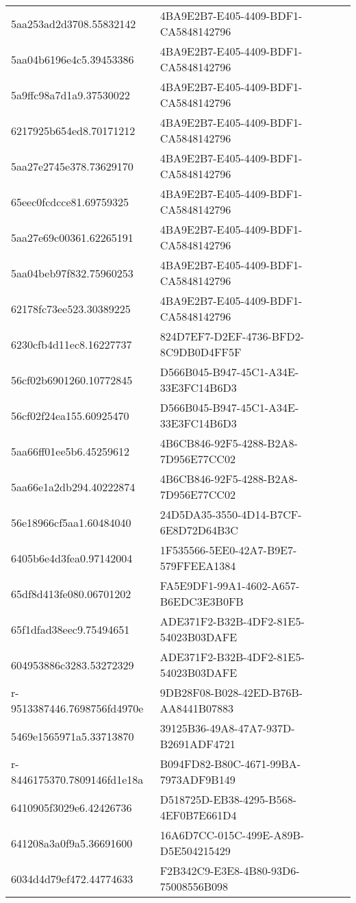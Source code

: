 \begin{tabular}{ll}
5aa253ad2d3708.55832142 & 4BA9E2B7-E405-4409-BDF1-CA5848142796 \\
5aa04b6196e4c5.39453386 & 4BA9E2B7-E405-4409-BDF1-CA5848142796 \\
5a9ffc98a7d1a9.37530022 & 4BA9E2B7-E405-4409-BDF1-CA5848142796 \\
6217925b654ed8.70171212 & 4BA9E2B7-E405-4409-BDF1-CA5848142796 \\
5aa27e2745e378.73629170 & 4BA9E2B7-E405-4409-BDF1-CA5848142796 \\
65eec0fcdcce81.69759325 & 4BA9E2B7-E405-4409-BDF1-CA5848142796 \\
5aa27e69c00361.62265191 & 4BA9E2B7-E405-4409-BDF1-CA5848142796 \\
5aa04beb97f832.75960253 & 4BA9E2B7-E405-4409-BDF1-CA5848142796 \\
62178fc73ee523.30389225 & 4BA9E2B7-E405-4409-BDF1-CA5848142796 \\
6230cfb4d11ec8.16227737 & 824D7EF7-D2EF-4736-BFD2-8C9DB0D4FF5F \\
56cf02b6901260.10772845 & D566B045-B947-45C1-A34E-33E3FC14B6D3 \\
56cf02f24ea155.60925470 & D566B045-B947-45C1-A34E-33E3FC14B6D3 \\
5aa66ff01ee5b6.45259612 & 4B6CB846-92F5-4288-B2A8-7D956E77CC02 \\
5aa66e1a2db294.40222874 & 4B6CB846-92F5-4288-B2A8-7D956E77CC02 \\
56e18966cf5aa1.60484040 & 24D5DA35-3550-4D14-B7CF-6E8D72D64B3C \\
6405b6e4d3fea0.97142004 & 1F535566-5EE0-42A7-B9E7-579FFEEA1384 \\
65df8d413fe080.06701202 & FA5E9DF1-99A1-4602-A657-B6EDC3E3B0FB \\
65f1dfad38eec9.75494651 & ADE371F2-B32B-4DF2-81E5-54023B03DAFE \\
604953886c3283.53272329 & ADE371F2-B32B-4DF2-81E5-54023B03DAFE \\
r-9513387446.7698756fd4970e & 9DB28F08-B028-42ED-B76B-AA8441B07883 \\
5469e1565971a5.33713870 & 39125B36-49A8-47A7-937D-B2691ADF4721 \\
r-8446175370.7809146fd1e18a & B094FD82-B80C-4671-99BA-7973ADF9B149 \\
6410905f3029e6.42426736 & D518725D-EB38-4295-B568-4EF0B7E661D4 \\
641208a3a0f9a5.36691600 & 16A6D7CC-015C-499E-A89B-D5E504215429 \\
6034d4d79ef472.44774633 & F2B342C9-E3E8-4B80-93D6-75008556B098 \\

\end{tabular}
